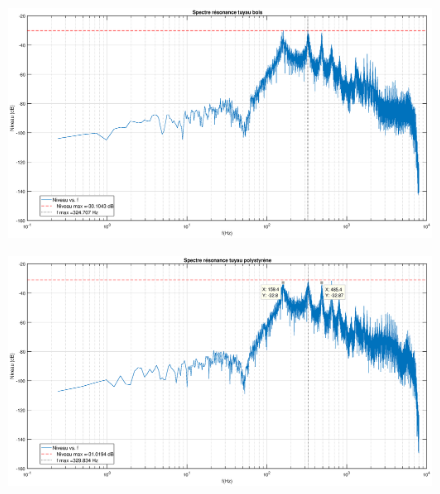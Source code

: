 \documentclass[12pt,a4paper]{article}
\begin{document}
\begin{figure}
	\centering
	\includegraphics[width=0.7\linewidth]{"res/Resonance tuyau bois"}
	\caption{}
	\label{fig:resonance-tuyau-bois}
\end{figure}
\begin{figure}
	\centering
	\includegraphics[width=0.7\linewidth]{"res/Resonance tuyau polystyrene"}
	\caption{}
	\label{fig:resonance-tuyau-polystyrene}
\end{figure}
\end{document}
